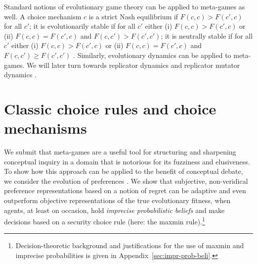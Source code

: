 \documentclass[fleqn,reqno,11pt]{article}
\begin{document}
Standard notions of evolutionary game theory can be applied to meta-games as well. A choice
mechanism $c$ is a strict Nash equilibrium if $F(c,c) > F(c',c)$ for all $c'$; it is
evolutionarily stable if for all $c'$ either (i) $F(c,c) > F(c',c)$ or (ii) $F(c,c) = F(c',c)$
and $F(c,c') > F(c',c')$; it is neutrally stable if for all $c'$ either (i) $F(c,c) > F(c',c)$
or (ii) $F(c,c) = F(c',c)$ and $F(c,c') \ge F(c',c')$
\citep{Maynard-Smith1982:Evolution-and-t}. Similarly, evolutionary dynamics can be applied to
meta-games. We will later turn towards replicator dynamics
\citep{TaylorJonker1978:Evolutionary-St} and replicator mutator dynamics
\citep[e.g.][]{Nowak2006:Evolutionary-Dy}.




\section{Classic choice rules and choice mechanisms}
\label{sec:basic-notions}

We submit that meta-games are a useful tool for structuring and sharpening conceptual inquiry
in a domain that is notorious for its fuzziness and elusiveness. To show how this approach can
be applied to the benefit of conceptual debate, we consider the evolution of preferences
\citep[e.g.,][]{algweib13,DekElyYlan07,RobSam11}. 
We show that subjective, non-veridical preference
representations based on a notion of regret can be adaptive and even outperform objective representations of the true evolutionary fitness, when agents, at least on occasion, hold
\emph{imprecise probabilistic beliefs} \citep[e.g.,][]{gilsch89,levi74,gardsah82} and make
decisions based on a security choice rule (here: the maxmin rule).\footnote{Decision-theoretic background and justifications for the use of maxmin and imprecise probabilities is given in Appendix~\ref{sec:impr-prob-beli}.}
\end{document}
